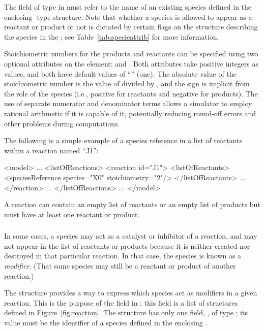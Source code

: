 \documentclass[10pt,twocolumntoc]{cekarticle}
\newcommand{\vref}[1]{\ref{#1}}
\begin{document}
The field  of type  in 
must refer to the name of an existing species defined in the enclosing
-type structure.  Note that whether a species is allowed to
appear as a reactant or product or not is dictated by certain flags on the
structure describing the species in the ; see
Table~\ref{tab:specieattrib} for more information.

Stoichiometric numbers for the products and reactants can be specified
using two optional attributes on the  element:
 and .  Both attributes take
positive integers as values, and both have default values of ``''
(one).  The absolute value of the stoichiometric number is the value of
 divided by , and the sign is
implicit from the role of the species (i.e., positive for reactants and
negative for products).  The use of separate numerator and denominator
terms allows a simulator to employ rational arithmetic if it is capable of
it, potentially reducing round-off errors and other problems during
computations.

The following is a simple example of a species reference in a list
of reactants within a reaction named ``J1'':
\begin{example}
<model>
    ...
    <listOfReactions>
        <reaction id="J1">
            <listOfReactants>
                <speciesReference species="X0" stoichiometry="2"/>
            </listOfReactants>
            ...
        </reaction>
        ...
    </listOfReactions>
    ...
</model>
\end{example}

A reaction can contain an empty list of reactants or an empty list
of products but must have at least one reactant or product.

\subsubsection{}
\label{subsec:modifierreference}

In some cases, a species may act as a catalyst or inhibitor of a reaction,
and may not appear in the list of reactants or products because it is
neither created nor destroyed in that particular reaction.  In that case,
the species is known as a \emph{modifier}.  (That same species may still be
a reactant or product of another reaction.)

The  structure provides a way to express which species act
as modifiers in a given reaction.  This is the purpose of the
 field in ; this field is a list of
 structures defined in
Figure~\vref{fig:reaction}.  The  structure
has only one field, , of type ; its value must
be the identifier of a species defined in the enclosing .
\end{document}
